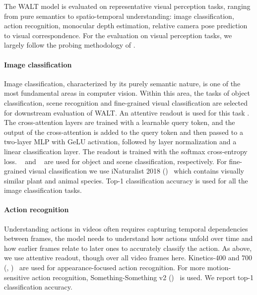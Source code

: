 The WALT model is evaluated on representative visual perception tasks, ranging from pure semantics to spatio-temporal understanding: image classification, action recognition, monocular depth estimation, relative camera pose prediction to visual correspondence.
For the evaluation on visual perception tasks, we largely follow the probing methodology of \citet{s4dpaper}.



\paragraph{Image classification}
Image classification, characterized by its purely semantic nature, is one of the most fundamental areas in computer vision. Within this area, the tasks of object classification, scene recognition and fine-grained visual classification are selected for downstream evaluation of WALT. 
An attentive readout is used for this task \cite{vjepa}. The cross-attention layers are trained with a learnable query token, and the output of the cross-attention is added to the query token and then passed to a two-layer MLP with GeLU activation, followed by layer normalization and a linear classification layer.
The readout is trained with the softmax cross-entropy loss.
\Timagenet~\cite{imagenet} and \Tplaces~\cite{places365} are used for object and scene classification, respectively. For fine-grained visual classification we use iNaturalist 2018 (\Tinat)~\cite{inaturalist} which contains visually similar plant and animal species.
Top-1 classification accuracy is used for all the image classification tasks.

\paragraph{Action recognition}
Understanding actions in videos often requires capturing temporal dependencies between frames, \ie the model needs to understand how actions unfold over time and how earlier frames relate to later ones to accurately classify the action.
As above, we use attentive readout, though over all video frames here.
Kinetics-400 and 700 (\Tkfour, \Tkseven)~\cite{kinetics400, k700} are used for appearance-focused action recognition.
For more motion-sensitive action recognition, Something-Something v2 (\Tssv)~\cite{ssv2} is used.
We report top-1 classification accuracy.


